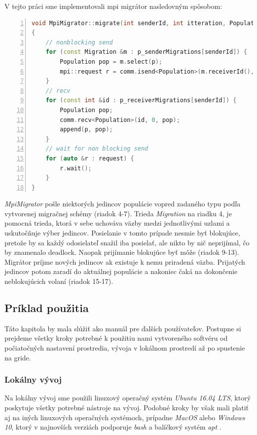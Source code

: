 V tejto práci sme implementovali \acrshort{mpi} migrátor nasledovným spôsobom:
\begin{lstlisting}[language=c++, caption={Kód MpiMigrator-a}, numbers={left}, label={lst:mpi-mig}]
void MpiMigrator::migrate(int senderId, int itteration, Population &population)
{
    // nonblocking send
    for (const Migration &m : p_senderMigrations[senderId]) {
        Population pop = m.select(p);
        mpi::request r = comm.isend<Population>(m.receiverId(), 0, pop);
    }
    // recv
    for (const int &id : p_receiverMigrations[senderId]) {
        Population pop;
        comm.recv<Population>(id, 0, pop);
        append(p, pop);
    }
    // wait for non blocking send
    for (auto &r : request) {
        r.wait();
    }
}
\end{lstlisting}
\textit{MpiMigrator} pošle niektorých jedincov populácie vopred zadaného typu podľa vytvorenej migračnej schémy (riadok 4-7).
Trieda \textit{Migration} na riadku 4, je pomocná trieda, ktorá v sebe uchováva väzby medzi jednotlivými uzlami a uskutočňuje výber jedincov.
Posielanie v tomto prípade nesmie byť blokujúce, pretože by sa každý odosielateľ snažil iba posielať, ale nikto by nič neprijímal, čo by znamenalo deadlock.
Naopak prijímanie blokujúce byť môže (riadok 9-13). Migrátor príjme nových jedincov ak existuje k nemu priradená väzba.
Prijatých jedincov potom zaradí do aktuálnej populácie a nakoniec čaká na dokončenie neblokujúcich volaní (riadok 15-17).

\subsection{Príklad použitia}
Táto kapitola by mala slúžiť ako manuál pre ďalších používateľov.
Postupne si prejdeme všetky kroky potrebné k použitiu nami vytvoreného softvéru od počiatočných nastavení prostredia,
vývoja v lokálnom prostredí až po spustenie na gride.

\subsubsection{Lokálny vývoj}
\label{subsec:local-dev}
Na lokálny vývoj sme použili linuxový operačný systém \textit{Ubuntu 16.04 LTS}, ktorý poskytuje všetky potrebné nástroje na vývoj.
Podobné kroky by však mali platiť aj na iných linuxových operačných systémoch, prípadne \textit{MacOS} alebo \textit{Windows 10},
ktorý v najnovších verziách podporuje \textit{bash} a balíčkový systém \textit{apt} \cite{bash-on-win}.

